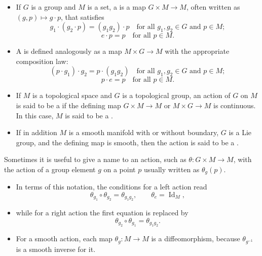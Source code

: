 \documentclass[../main.tex]{subfiles}
\begin{document}
\begin{definition}{}{}
    \begin{itemize}
        \item  If \(G\) is a group and \(M\) is a set, a  is a map \(G \times M \to M\), often written as \((g,p) \mapsto g \cdot p\), that satisfies
\[
g_{1}\cdot (g_{2}\cdot p) = (g_{1}g_{2})\cdot p \quad \text{for all } g_{1}, g_{2}\in G \text{ and } p\in M ;
\]
\begin{equation}
e\cdot p = p \quad \text{for all } p\in M .
\end{equation}

    \item 
A  is defined analogously as a map \(M \times G \to M\) with the appropriate composition law:
\[
(p\cdot g_{1})\cdot g_{2} = p\cdot (g_{1}g_{2}) \quad \text{for all } g_{1}, g_{2}\in G \text{ and } p\in M ;
\]
\[
p\cdot e = p \quad \text{for all } p\in M .
\]
\item 

If \(M\) is a topological space and \(G\) is a topological group, an action of \(G\) on \(M\) is said to be a  if the defining map \(G \times M \to M\) or \(M \times G \to M\) is continuous.
    In this case, \(M\) is said to be a .

\item   If in addition \(M\) is a smooth manifold with or without boundary, \(G\) is a Lie group, and the defining map is smooth, then the action is said to be a . 

    \end{itemize}
   
\end{definition}

\begin{definition}{}{}
    Sometimes it is useful to give a name to an action, such as \(\theta:G\times M\to M\), with the action of a group element \(g\) on a point \(p\) usually written as \(\theta_{g}(p)\). 
    \begin{itemize}
        \item In terms of this notation, the conditions for a left action read
\begin{equation}
\theta_{g_{1}}\circ\theta_{g_{2}}=\theta_{g_{1}g_{2}},\qquad
\theta_{e}=\operatorname{Id}_{M},
\end{equation}
\item 
while for a right action the first equation is replaced by
\begin{equation}
\theta_{g_{2}}\circ\theta_{g_{1}}=\theta_{g_{1}g_{2}}.
\end{equation}
\item 
For a smooth action, each map \(\theta_{g}:M\to M\) is a diffeomorphism, because \(\theta_{g^{-1}}\) is a smooth inverse for it.
    \end{itemize}
    
\end{definition}
\end{document}
